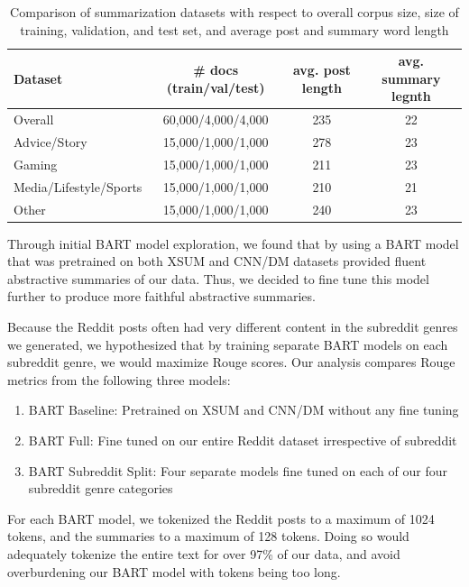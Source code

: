 \documentclass[11pt,a4paper, twocolumn]{article}
\begin{document}
\begin{table}
  \centering
  \begin{tabular}{lccc}
  \hline \textbf{Dataset} & \textbf{\# docs (train/val/test)} & \textbf{avg. post length} & \textbf{avg. summary legnth} \\ \hline
  Overall & 60,000/4,000/4,000  & 235 & 22 \\
  Advice/Story & 15,000/1,000/1,000 & 278 & 23 \\
  Gaming & 15,000/1,000/1,000 & 211 & 23 \\
  Media/Lifestyle/Sports & 15,000/1,000/1,000 & 210 & 21 \\
  Other & 15,000/1,000/1,000 & 240 & 23 \\
  \hline
  \end{tabular}
  \caption{\label{final_counts} Comparison of summarization datasets with respect to overall corpus size, size of training, validation, and
  test set, and average post and summary word length}
\end{table}

Through initial BART model exploration, we found that by using a BART model that was pretrained on both XSUM and CNN/DM datasets 
provided fluent abstractive summaries of our data. Thus, we decided to fine tune this model further to produce more faithful 
abstractive summaries. 

Because the Reddit posts often had very different content in the subreddit genres we generated, we hypothesized that by training 
separate BART models on each subreddit genre, we would maximize Rouge scores. Our analysis compares Rouge metrics from the following three models:

\begin{enumerate}
  \item BART Baseline: Pretrained on XSUM and CNN/DM without any fine tuning
  \item BART Full: Fine tuned on our entire Reddit dataset irrespective of subreddit
  \item BART Subreddit Split: Four separate models fine tuned on each of our four subreddit genre categories
\end{enumerate}

For each BART model, we tokenized the Reddit posts to a maximum of 1024 tokens, and the summaries to a maximum of 128 tokens. 
Doing so would adequately tokenize the entire text for over 97\% of our data, and avoid overburdening our BART model with tokens being too long. 
\end{document}
